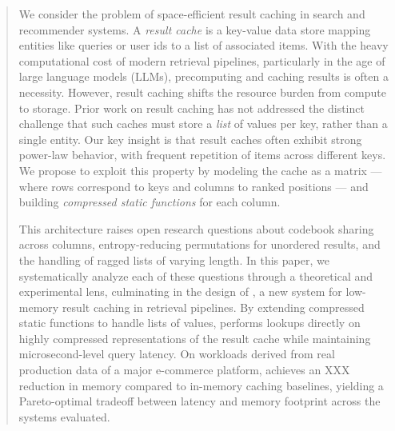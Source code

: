 \begin{abstract}
We consider the problem of space-efficient result caching in search and recommender systems. A \emph{result cache} is a key-value data store mapping entities like queries or user ids to a list of associated items. With the heavy computational cost of modern retrieval pipelines, particularly in the age of large language models (LLMs), precomputing and caching results is often a necessity. However, result caching shifts the resource burden from compute to storage. Prior work on result caching has not addressed the distinct challenge that such caches must store a \emph{list} of values per key, rather than a single entity.
Our key insight is that result caches often exhibit strong power-law behavior, with frequent repetition of items across different keys. We propose to exploit this property by modeling the cache as a matrix — where rows correspond to keys and columns to ranked positions — and building \emph{compressed static functions} for each column. 

This architecture raises open research questions about codebook sharing across columns, entropy-reducing permutations for unordered results, and the handling of ragged lists of varying length.
In this paper, we systematically analyze each of these questions through a theoretical and experimental lens, culminating in the design of \sys, a new system for low-memory result caching in retrieval pipelines. By extending compressed static functions to handle lists of values, \sys performs lookups directly on highly compressed representations of the result cache while maintaining microsecond-level query latency. On workloads derived from real production data of a major e-commerce platform, \sys achieves an XXX reduction in memory compared to in-memory caching baselines, yielding a Pareto-optimal tradeoff between latency and memory footprint across the systems evaluated.
\end{abstract}